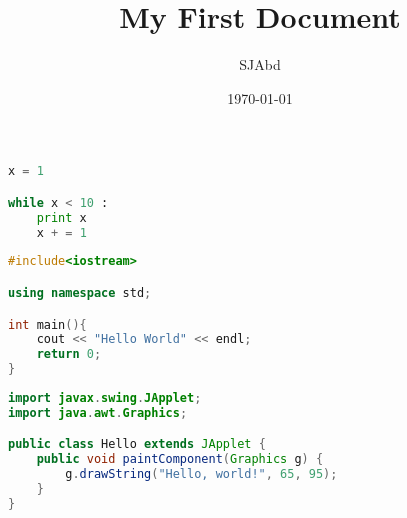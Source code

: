 \documentclass[a4paper,12pt]{article}
\begin{document}
\title{My First Document}
\author{SJAbd}
\date{\today}
\maketitle

\lstlistoflistings


\begin{lstlisting}[language=Python, caption=Python example]
x = 1

while x < 10 :
	print x 
	x + = 1
\end{lstlisting}


\lstset{style=mystyle}
\begin{lstlisting}[language=C++, caption=C++ example]
#include<iostream>

using namespace std;

int main(){
	cout << "Hello World" << endl;
	return 0;
}
\end{lstlisting}


\newpage
\lstset{style=javaStyle}
\begin{lstlisting}[language=Java, caption=Java example]
import javax.swing.JApplet;
import java.awt.Graphics;

public class Hello extends JApplet {
    public void paintComponent(Graphics g) {
        g.drawString("Hello, world!", 65, 95);
    }    
}
\end{lstlisting}
\end{document}

